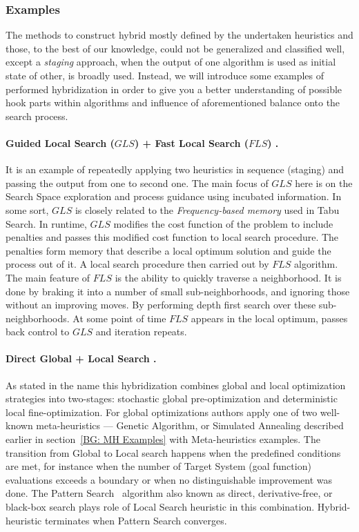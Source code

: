 \subsubsection{Examples}

The methods to construct hybrid mostly defined by the undertaken heuristics and those, to the best of our knowledge, could not be generalized and classified well, except a \textit{staging} approach, when the output of one algorithm is used as initial state of other, is broadly used. Instead, we will introduce some examples of performed hybridization in order to give you a better understanding of possible hook parts within algorithms and influence of aforementioned balance onto the search process.

\paragraph{Guided Local Search ($GLS$) + Fast Local Search ($FLS$) \cite{tsang1997fast}.}
It is an example of repeatedly applying two heuristics in sequence (staging) and passing the output from one to second one.
The main focus of $GLS$ here is on the Search Space exploration and process guidance using incubated information. In some sort, $GLS$ is closely related to the \textit{Frequency-based memory} used in Tabu Search. In runtime, $GLS$ modifies the cost function of the problem to include penalties and passes this modified cost function to local search procedure. The penalties form memory that describe a local optimum solution and guide the process out of it. A local search procedure then carried out by $FLS$ algorithm. The main feature of $FLS$ is the ability to quickly traverse a neighborhood. It is done by braking it into a number of small sub-neighborhoods, and ignoring those without an improving moves. By performing depth first search over these sub-neighborhoods. At some point of time $FLS$ appears in the local optimum, passes back control to $GLS$ and iteration repeats. 

\paragraph{Direct Global + Local Search \cite{syrjakow1999efficient}.}
As stated in the name this hybridization combines global and local optimization strategies into two-stages: stochastic global pre-optimization and deterministic local fine-optimization. For global optimizations authors apply one of two well-known meta-heuristics — Genetic Algorithm, or Simulated Annealing described earlier in section~\ref{BG: MH Examples} with Meta-heuristics examples. The transition from Global to Local search happens when the predefined conditions are met, for instance when the number of Target System (goal function) evaluations exceeds a boundary or when no distinguishable improvement was done. The Pattern Search~\cite{hooke1961direct} algorithm also known as direct, derivative-free, or black-box search plays role of Local Search heuristic in this combination. Hybrid-heuristic terminates when Pattern Search converges.

